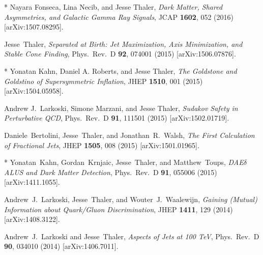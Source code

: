 \documentclass[11pt]{article}
\renewcommand{\bibitem}[1]{\item}
\begin{document}
\begin{list}{[]\addtocounter{jessecount}{-1}}{\leftmargin=3em \itemsep=4pt}
  
\bibitem{Fonseca:2015rwa} 
  * Nayara Fonseca, Lina Necib, and Jesse Thaler,
  \emph{Dark Matter, Shared Asymmetries, and Galactic Gamma Ray Signals},
  JCAP {\bf 1602}, 052 (2016)
  [arXiv:1507.08295].
  
  
\bibitem{Thaler:2015uja} 
  Jesse~Thaler,
  \emph{Separated at Birth: Jet Maximization, Axis Minimization, and Stable Cone Finding},
  Phys.\ Rev.\ D {\bf 92}, 074001 (2015)
  [arXiv:1506.07876].
  

\bibitem{Kahn:2015mla} 
  * Yonatan Kahn, Daniel A. Roberts, and Jesse Thaler,
  \emph{The Goldstone and Goldstino of Supersymmetric Inflation},
  JHEP {\bf 1510}, 001 (2015)
  [arXiv:1504.05958].
    
  
\bibitem{Larkoski:2015lea} 
  Andrew J.\ Larkoski, Simone Marzani, and Jesse Thaler,
  \emph{Sudakov Safety in Perturbative QCD},
  Phys.\ Rev.\ D {\bf 91}, 111501 (2015)
  [arXiv:1502.01719].

\bibitem{Bertolini:2015pka} 
  Daniele~Bertolini, Jesse~Thaler, and Jonathan~R.~Walsh, 
  \emph{The First Calculation of Fractional Jets},
  JHEP {\bf 1505}, 008 (2015)
  [arXiv:1501.01965].
  
\bibitem{Kahn:2014sra} 
  * Yonatan~Kahn, Gordan~Krnjaic, Jesse~Thaler, and Matthew~Toups, 
  \emph{DAE$\delta$ALUS and Dark Matter Detection},
  Phys.\ Rev.\ D {\bf 91}, 055006 (2015)
  [arXiv:1411.1055].
  
\bibitem{Larkoski:2014pca} 
  Andrew~J.~Larkoski, Jesse~Thaler, and Wouter~J.~Waalewijn,
  \emph{Gaining (Mutual) Information about Quark/Gluon Discrimination},
  JHEP {\bf 1411}, 129 (2014)
  [arXiv:1408.3122].
  
  
\bibitem{Larkoski:2014bia} 
  Andrew~J.~Larkoski and Jesse~Thaler, 
  \emph{Aspects of Jets at 100 TeV},
  Phys.\ Rev.\ D {\bf 90}, 034010 (2014)
  [arXiv:1406.7011].


\end{list}
\end{document}
